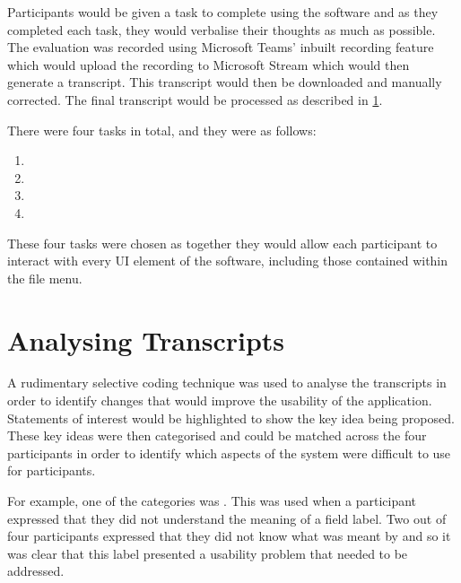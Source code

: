 \documentclass{l4proj}
\begin{document}
Participants would be given a task to complete using the software and as they completed each task, they would verbalise their thoughts as much as possible. The evaluation was recorded using Microsoft Teams' inbuilt recording feature which would upload the recording to Microsoft Stream which would then generate a transcript. This transcript would then be downloaded and manually corrected. The final transcript would be processed as described in \ref{analysing-transcripts}.

There were four tasks in total, and they were as follows:
\begin{enumerate}
    \item {}
    \item {}
    \item {}
    \item {}
\end{enumerate}
These four tasks were chosen as together they would allow each participant to interact with every UI element of the software, including those contained within the file menu.

\section{Analysing Transcripts} \label{analysing-transcripts}
A rudimentary selective coding technique was used to analyse the transcripts in order to identify changes that would improve the usability of the application. Statements of interest would be highlighted to show the key idea being proposed. These key ideas were then categorised and could be matched across the four participants in order to identify which aspects of the system were difficult to use for participants. 

For example, one of the categories was . This was used when a participant expressed that they did not understand the meaning of a field label. Two out of four participants expressed that they did not know what was meant by  and so it was clear that this label presented a usability problem that needed to be addressed.
\end{document}
